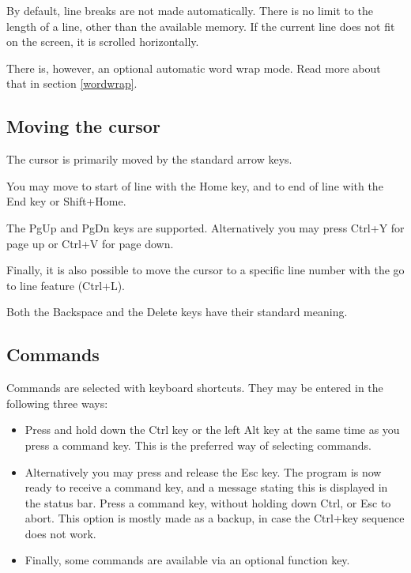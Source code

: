 \documentclass{article}
\begin{document}
        By default, line breaks are not made automatically. There is no limit
        to the length of a line, other than the available memory. If 
        the current line does not fit on the screen, it is 
        scrolled horizontally. 
        
        There is, however, an optional automatic 
        word wrap mode. Read more about that in section \ref{wordwrap}.
       
    \subsection{Moving the cursor}

        The cursor is primarily moved by the standard arrow keys.

        You may move to start of line with the Home key, and to end of line with the End key or Shift+Home.

        The PgUp and PgDn keys are supported. Alternatively you may press
        Ctrl+Y for page up or Ctrl+V for page down.

        Finally, it is also possible to move the cursor to a specific line number 
        with the go to line feature (Ctrl+L).

        Both the Backspace and the Delete keys have their standard meaning.

    \subsection{Commands}
    \label{commands}
    
        Commands are selected with keyboard shortcuts. They may be entered in the following three ways:

        \begin{itemize}

            \item Press and hold down the Ctrl key or the left Alt key at the same time as you press a command key. This is the
            preferred way of selecting commands.
            
            \item Alternatively you may press and release the Esc key. The program is now ready to receive
            a command key, and a message stating this is displayed in the status bar. 
            Press a command key, without holding down Ctrl, or Esc to abort. This option is mostly
            made as a backup, in case the Ctrl+key sequence does not work. 
            
            \item Finally, some commands are available via an optional function key.
        \end{itemize}
\end{document}

